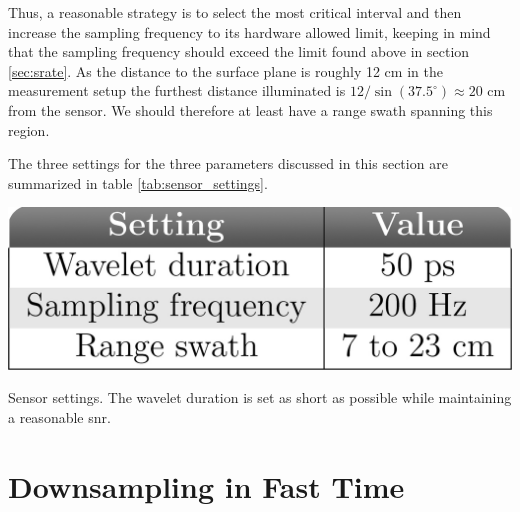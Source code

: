 Thus, a reasonable strategy is to select the most critical interval and then increase the sampling frequency to its hardware allowed limit, keeping in mind that the sampling frequency should exceed the limit found above in section \ref{sec:srate}. As the distance to the surface plane is roughly 12 cm in the measurement setup the furthest distance illuminated is $12/\sin(37.5^\circ)\approx 20$ cm from the sensor. We should therefore at least have a range swath spanning this region. 

The three settings for the three parameters discussed in this section are summarized in table \ref{tab:sensor_settings}.

\begin{table}
	\begin{center}
		\includegraphics[scale=0.70]{figs_temp/table_settings.jpg}
	\end{center}
	\caption{Sensor settings. The wavelet duration is set as short as possible while maintaining a reasonable \gls{snr}.}
	\label{tab:sensor_settings}
\end{table}

\section{Downsampling in Fast Time}
\label{downsampling}

